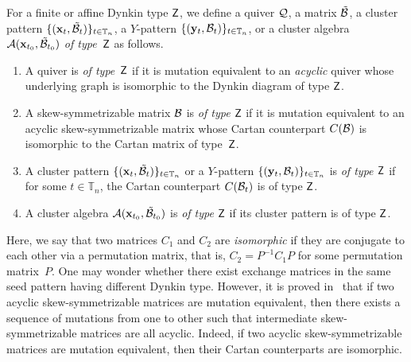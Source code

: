 \begin{definition}\label{def_quiver_of_type_X}
For a finite or affine Dynkin type $\mathsf{Z}$, we define a quiver $\mathcal{Q}$, a matrix $\mathcal{\tilde{B}}$, a cluster pattern $\{(\mathbf{x}_t, \mathcal{\tilde{B}}_t)\}_{t \in \mathbb{T}_n}$, a $Y$-pattern $\{(\mathbf{y}_t, \mathcal{B}_t)\}_{t \in \mathbb{T}_n}$, or a cluster algebra $\mathcal{A}(\mathbf{x}_{t_0}, \mathcal{\tilde{B}}_{t_0})$ \emph{of type~$\mathsf{Z}$} as follows.
\begin{enumerate}
\item A quiver is \textit{of type~$\mathsf{Z}$} 
if it is mutation equivalent to an \emph{acyclic} quiver whose underlying graph is isomorphic to the Dynkin 
diagram of type $\mathsf{Z}$.
\item A skew-symmetrizable matrix $\mathcal{B}$ is \textit{of 
type $\mathsf{Z}$} if it is mutation equivalent to an acyclic skew-symmetrizable matrix whose 
Cartan counterpart $C(\mathcal{B})$ is isomorphic to the Cartan matrix of type~$\mathsf{Z}$. 
\item A cluster pattern $\{(\mathbf{x}_t, \mathcal{\tilde{B}}_t)\}_{t \in \mathbb{T}_n}$ or a $Y$-pattern $\{(\mathbf{y}_t, \mathcal{B}_t)\}_{t \in \mathbb{T}_n}$ is \textit{of type $\mathsf{Z}$} if for some $t \in \mathbb{T}_n$, the Cartan counterpart  $C(\mathcal{B}_t)$ is of type $\mathsf{Z}$.
\item A cluster algebra $\mathcal{A}(\mathbf{x}_{t_0}, \mathcal{\tilde{B}}_{t_0})$ is \textit{of type $\mathsf{Z}$} if its cluster pattern is of type $\mathsf{Z}$.
\end{enumerate}
\end{definition}

Here, we say that two matrices $C_1$ and $C_2$ are \emph{isomorphic} if they are conjugate to each other via a permutation matrix, that is, $C_2 = P^{-1} C_1 P$ for some permutation matrix~$P$. 
One may wonder whether there exist exchange matrices in the same seed pattern having different Dynkin type. 
However, it is proved in~\cite[Corollary~4]{CalderoKeller06} that if two acyclic skew-symmetrizable matrices are mutation equivalent, then there exists a sequence of mutations from one to other such that intermediate skew-symmetrizable matrices are all acyclic. Indeed, if two acyclic skew-symmetrizable matrices are mutation equivalent, then their Cartan counterparts are isomorphic. 

